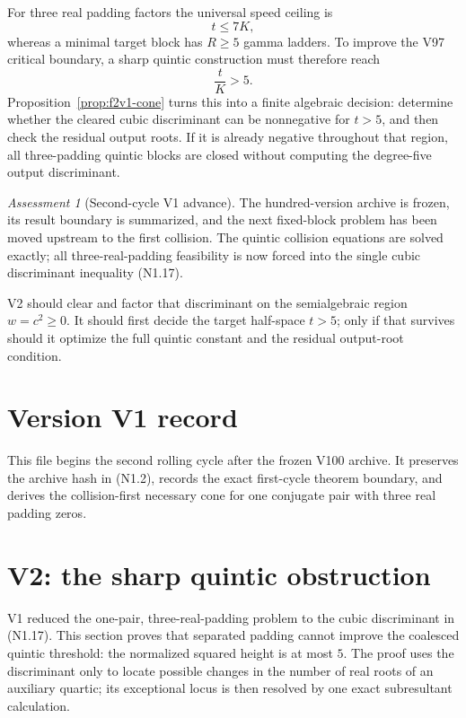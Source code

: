 \documentclass[11pt]{article}
\theoremstyle{definition}
\theoremstyle{remark}
\newtheorem{assessment}[theorem]{Assessment}
\begin{document}
For three real padding factors the universal speed ceiling is
\[
 t\le7K,
\tag{N1.18}
\]
whereas a minimal target block has \(R\ge5\) gamma ladders.  To improve the
V97 critical boundary, a sharp quintic construction must therefore reach
\[
 \frac{t}{K}>5.
\tag{N1.19}
\]
Proposition~\ref{prop:f2v1-cone} turns this into a finite algebraic
decision: determine whether the cleared cubic discriminant can be
nonnegative for \(t>5\), and then check the residual output roots.  If it
is already negative throughout that region, all three-padding quintic
blocks are closed without computing the degree-five output discriminant.

\begin{assessment}[Second-cycle V1 advance]
\label{ass:f2v1}
The hundred-version archive is frozen, its result boundary is summarized,
and the next fixed-block problem has been moved upstream to the first
collision.  The quintic collision equations are solved exactly; all
three-real-padding feasibility is now forced into the single cubic
discriminant inequality \textup{(N1.17)}.

V2 should clear and factor that discriminant on the semialgebraic region
\(w=c^2\ge0\).  It should first decide the target half-space \(t>5\);
only if that survives should it optimize the full quintic constant and
the residual output-root condition.
\end{assessment}

\section*{Version V1 record}
This file begins the second rolling cycle after the frozen V100 archive.
It preserves the archive hash in \textup{(N1.2)}, records the exact
first-cycle theorem boundary, and derives the collision-first necessary
cone for one conjugate pair with three real padding zeros.



\section{V2: the sharp quintic obstruction}
\label{sec:grh-v2}

V1 reduced the one-pair, three-real-padding problem to the cubic
discriminant in \textup{(N1.17)}.  This section proves that separated
padding cannot improve the coalesced quintic threshold: the normalized
squared height is at most \(5\).  The proof uses the discriminant only to
locate possible changes in the number of real roots of an auxiliary
quartic; its exceptional locus is then resolved by one exact
subresultant calculation.
\end{document}

